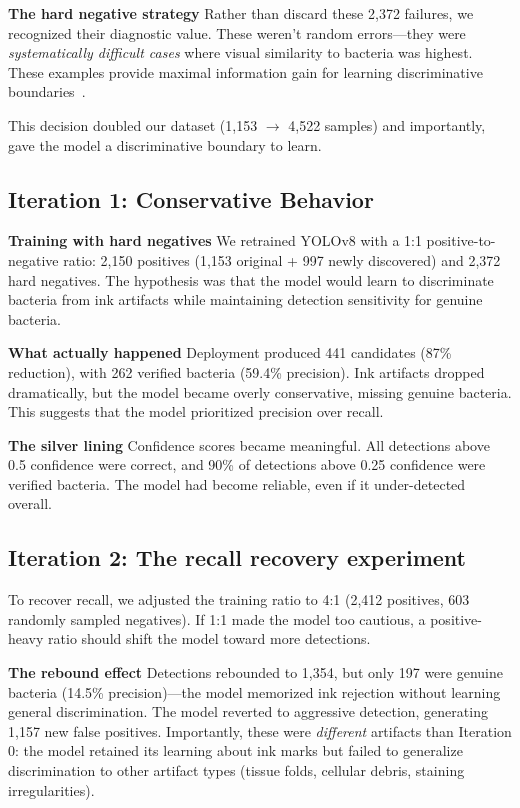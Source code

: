 \documentclass[sigconf, review, nonacm]{acmart}
\begin{document}
\noindent \textbf{The hard negative strategy}
Rather than discard these 2,372 failures, we recognized their diagnostic value. These weren't random errors—they were \textit{systematically difficult cases} where visual similarity to bacteria was highest. These examples provide maximal information gain for learning discriminative boundaries~\cite{shrivastava2016hard}.

This decision doubled our dataset (1,153 $\rightarrow$ 4,522 samples) and importantly, gave the model a discriminative boundary to learn.

\subsection{Iteration 1: Conservative Behavior}

\noindent \textbf{Training with hard negatives}
We retrained YOLOv8 with a 1:1 positive-to-negative ratio: 2,150 positives (1,153 original + 997 newly discovered) and 2,372 hard negatives. The hypothesis was that the model would learn to discriminate bacteria from ink artifacts while maintaining detection sensitivity for genuine bacteria.

\noindent \textbf{What actually happened}
Deployment produced 441 candidates (87\% reduction), with 262 verified bacteria (59.4\% precision). Ink artifacts dropped dramatically, but the model became overly conservative, missing genuine bacteria. This suggests that the model prioritized precision over recall.

\noindent \textbf{The silver lining} Confidence scores became meaningful. All detections above 0.5 confidence were correct, and 90\% of detections above 0.25 confidence were verified bacteria. The model had become reliable, even if it under-detected overall.

\subsection{Iteration 2: The recall recovery experiment}

To recover recall, we adjusted the training ratio to 4:1 (2,412 positives, 603 randomly sampled negatives). If 1:1 made the model too cautious, a positive-heavy ratio should shift the model toward more detections.

\noindent \textbf{The rebound effect}
Detections rebounded to 1,354, but only 197 were genuine bacteria (14.5\% precision)—the model memorized ink rejection without learning general discrimination. The model reverted to aggressive detection, generating 1,157 new false positives. Importantly, these were \textit{different} artifacts than Iteration 0: the model retained its learning about ink marks but failed to generalize discrimination to other artifact types (tissue folds, cellular debris, staining irregularities).
\end{document}
